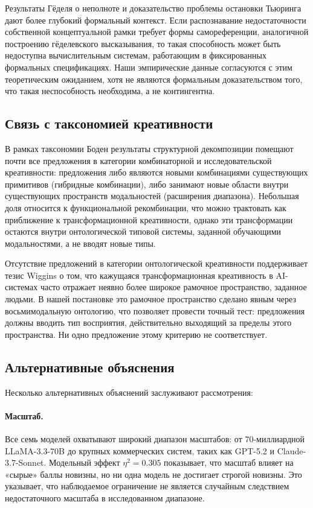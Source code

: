 \documentclass[sn-mathphys-num]{sn-jnl}
\begin{document}
Результаты Гёделя о неполноте \cite{godel1931formal} и доказательство проблемы остановки Тьюринга \cite{turing1936computable} дают более глубокий формальный контекст. Если распознавание недостаточности собственной концептуальной рамки требует формы самореференции, аналогичной построению гёделевского высказывания, то такая способность может быть недоступна вычислительным системам, работающим в фиксированных формальных спецификациях. Наши эмпирические данные согласуются с этим теоретическим ожиданием, хотя не являются формальным доказательством того, что такая неспособность необходима, а не контингентна.

\subsection{Связь с таксономией креативности}

В рамках таксономии Боден \cite{boden2004creative} результаты структурной декомпозиции помещают почти все предложения в категории комбинаторной и исследовательской креативности: предложения либо являются новыми комбинациями существующих примитивов (гибридные комбинации), либо занимают новые области внутри существующих пространств модальностей (расширения диапазона). Небольшая доля относится к функциональной рекомбинации, что можно трактовать как приближение к трансформационной креативности, однако эти трансформации остаются внутри онтологической типовой системы, заданной обучающими модальностями, а не вводят новые типы.

Отсутствие предложений в категории онтологической креативности поддерживает тезис Wiggins \cite{wiggins2006preliminary} о том, что кажущаяся трансформационная креативность в AI-системах часто отражает неявно более широкое рамочное пространство, заданное людьми. В нашей постановке это рамочное пространство сделано явным через восьмимодальную онтологию, что позволяет провести точный тест: предложения должны вводить тип восприятия, действительно выходящий за пределы этого пространства. Ни одно предложение этому критерию не соответствует.

\subsection{Альтернативные объяснения}

Несколько альтернативных объяснений заслуживают рассмотрения:

\paragraph{Масштаб.} Все семь моделей охватывают широкий диапазон масштабов: от 70-миллиардной LLaMA-3.3-70B до крупных коммерческих систем, таких как GPT-5.2 и Claude-3.7-Sonnet. Модельный эффект $\eta^{2} = 0.305$ показывает, что масштаб влияет на «сырые» баллы новизны, но ни одна модель не достигает строгой новизны. Это указывает, что наблюдаемое ограничение не является случайным следствием недостаточного масштаба в исследованном диапазоне.
\end{document}
